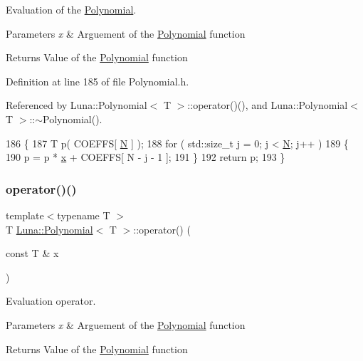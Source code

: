 Evaluation of the \hyperlink{classLuna_1_1Polynomial}{Polynomial}. 


\begin{DoxyParams}{Parameters}
{\em x} & Arguement of the \hyperlink{classLuna_1_1Polynomial}{Polynomial} function \\
\hline
\end{DoxyParams}
\begin{DoxyReturn}{Returns}
Value of the \hyperlink{classLuna_1_1Polynomial}{Polynomial} function 
\end{DoxyReturn}


Definition at line 185 of file Polynomial.\+h.



Referenced by Luna\+::\+Polynomial$<$ T $>$\+::operator()(), and Luna\+::\+Polynomial$<$ T $>$\+::$\sim$\+Polynomial().


\begin{DoxyCode}
186     \{
187         T p( COEFFS[ \hyperlink{namespaceHeat__plot_a7d050092798e28458a263710837bda77}{N} ] );
188         \textcolor{keywordflow}{for} ( std::size\_t j = 0; j < \hyperlink{namespaceHeat__plot_a7d050092798e28458a263710837bda77}{N}; j++ )
189         \{
190             p = p * \hyperlink{namespaceHeat__plot_aa88370c16b85b784ccbde3ed88bc1991}{x} + COEFFS[ N - j - 1 ];
191         \}
192         \textcolor{keywordflow}{return} p;
193     \}
\end{DoxyCode}
\mbox{\label{classLuna_1_1Polynomial_a03016909c173bfd72db4be42923a960a}} 
\subsubsection{\texorpdfstring{operator()()}{operator()()}}
{\footnotesize\ttfamily template$<$typename T $>$ \\
T \hyperlink{classLuna_1_1Polynomial}{Luna\+::\+Polynomial}$<$ T $>$\+::operator() (\begin{DoxyParamCaption}\item[{const T \&}]{x }\end{DoxyParamCaption})\hspace{0.3cm}{\ttfamily [inline]}}



Evaluation operator. 


\begin{DoxyParams}{Parameters}
{\em x} & Arguement of the \hyperlink{classLuna_1_1Polynomial}{Polynomial} function \\
\hline
\end{DoxyParams}
\begin{DoxyReturn}{Returns}
Value of the \hyperlink{classLuna_1_1Polynomial}{Polynomial} function 
\end{DoxyReturn}


